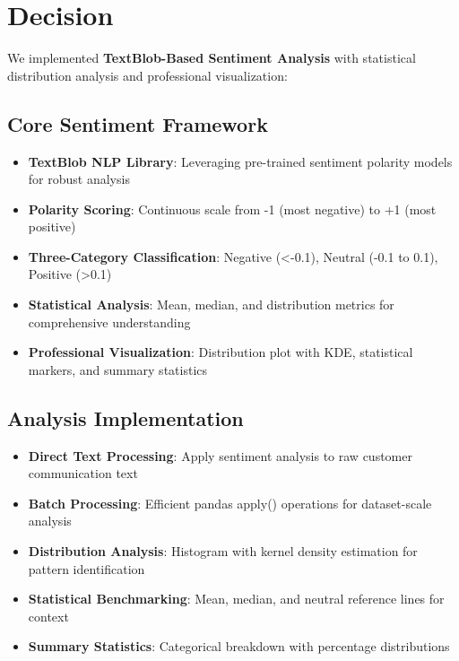 \documentclass[11pt]{article}
\begin{document}
\section{Decision}

We implemented \textbf{TextBlob-Based Sentiment Analysis} with statistical distribution analysis and professional visualization:

\subsection{Core Sentiment Framework}
\begin{itemize}
\item \textbf{TextBlob NLP Library}: Leveraging pre-trained sentiment polarity models for robust analysis
\item \textbf{Polarity Scoring}: Continuous scale from -1 (most negative) to +1 (most positive)
\item \textbf{Three-Category Classification}: Negative (<-0.1), Neutral (-0.1 to 0.1), Positive (>0.1)
\item \textbf{Statistical Analysis}: Mean, median, and distribution metrics for comprehensive understanding
\item \textbf{Professional Visualization}: Distribution plot with KDE, statistical markers, and summary statistics
\end{itemize}

\subsection{Analysis Implementation}
\begin{itemize}
\item \textbf{Direct Text Processing}: Apply sentiment analysis to raw customer communication text
\item \textbf{Batch Processing}: Efficient pandas apply() operations for dataset-scale analysis
\item \textbf{Distribution Analysis}: Histogram with kernel density estimation for pattern identification
\item \textbf{Statistical Benchmarking}: Mean, median, and neutral reference lines for context
\item \textbf{Summary Statistics}: Categorical breakdown with percentage distributions
\end{itemize}
\end{document}
